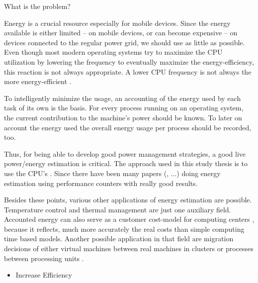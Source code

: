 
What is the problem?

Energy is a crucial resource especially for mobile devices. Since the energy
available is either limited -- on mobile devices, or can become expensive -- on
devices connected to the regular power grid, we should use as little as
possible. Even though most modern operating systems try to maximize the CPU
utilization by lowering the frequency \cite{snowdon2010operating} to eventually
maximize the energy-efficiency, this reaction is not always appropriate. A lower
CPU frequency is not always the more energy-efficient
\cite{weissel2002process,snowdon2010operating}.

To intelligently minimize the usage, an accounting of the energy used
by each task of its own is the basis. For every process running on an operating
system, the current contribution to the machine's power should be known. To
later on account the energy used the overall energy usage per process should be
recorded, too.

Thus, for being able to develop good power management strategies, a good live
power/energy estimation is critical. The approach used in this study thesis is
to use the CPU's .  Since
\cite{bellosa2000benefits} there have been many papers
(\cite{Bertran2010,bertran2010decomposable,kellner03tempcontrol,isci2003runtime,
weissel2002process}, ...) doing energy estimation using performance counters
with really good results.

Besides these points, various other applications of energy estimation are
possible. Temperature control \cite{kellner03tempcontrol} and thermal management
\cite{merkel05tmsmpsys} are just one auxiliary field. Accounted energy can also
serve as a customer cost-model for computing centers \cite{Bertran2010}, because
it reflects, much more accurately the real costs than simple computing time
based models. Another possible application in that field are migration decisions
of either virtual machines between real machines in clusters or processes
between processing units \cite{merkel10rcscheduling}.

\begin{itemize}

\item Increase Efficiency

\end{itemize}

\label{sec:restrictions}

